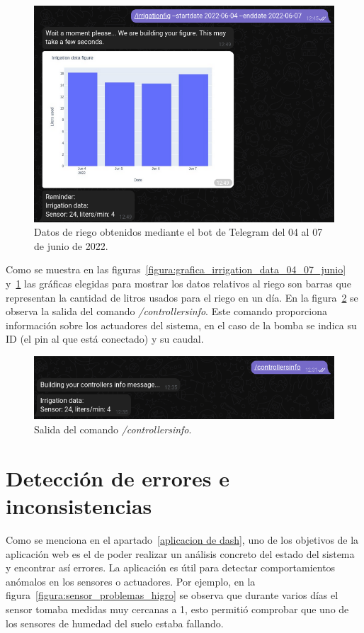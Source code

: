 \documentclass[a4paper, 12pt, oneside]{book}
\begin{document}
\begin{figure}[H]
	\centering
    \includegraphics[width=12cm, keepaspectratio]{img/irrigationfig_04_07_junio}
    \caption{Datos de riego obtenidos mediante el bot de Telegram del 04 al 07 de junio de 2022.}
    \label{figura:irrigationfig_04_07_junio}
\end{figure}

Como se muestra en las figuras~\ref{figura:grafica_irrigation_data_04_07_junio} y~\ref{figura:irrigationfig_04_07_junio} las gráficas elegidas para mostrar los datos relativos al riego son barras que representan la cantidad de litros usados para el riego en un día. En la figura~\ref{figura:comando controllers info} se observa la salida del comando \textit{/controllersinfo}. Este comando proporciona información sobre los actuadores del sistema, en el caso de la bomba se indica su ID (el pin al que está conectado) y su caudal.

\begin{figure}[H]
	\centering
    \includegraphics[width=12cm, keepaspectratio]{img/controllers_info}
    \caption{Salida del comando \textit{/controllersinfo}.}
    \label{figura:comando controllers info}
\end{figure}


\section{Detección de errores e inconsistencias}
\label{sec:detección de errorese inconsistencias}
Como se menciona en el apartado~\ref{aplicacion de dash}, uno de los objetivos de la aplicación web es el de poder realizar un análisis concreto del estado del sistema y encontrar así errores.
La aplicación es útil para detectar comportamientos anómalos en los sensores o actuadores. Por ejemplo, en la figura~\ref{figura:sensor_problemas_higro} se observa que durante varios días el sensor tomaba medidas muy cercanas a 1, esto permitió comprobar que uno de los sensores de humedad del suelo estaba fallando.
\end{document}
